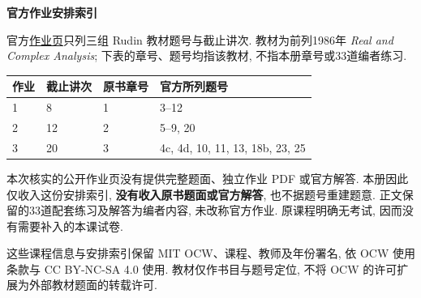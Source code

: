 \clearpage
{}
{}
\begin{center}
{\color{structurecolor}\bfseries\fontsize{14.4}{20}\selectfont 官方作业安排索引\par}
\end{center}
官方\href{https://ocw.mit.edu/courses/18-125-measure-and-integration-fall-2003/pages/assignments/}{作业页}只列三组 Rudin 教材题号与截止讲次. 教材为前列1986年 \textit{Real and Complex Analysis}; 下表的章号、题号均指该教材, 不指本册章号或33道编者练习.

\begin{center}
\begin{tabular}{@{}p{}p{}p{}p{}@{}}
\toprule
作业 & 截止讲次 & 原书章号 & 官方所列题号 \\
\midrule
1 & 8 & 1 & 3--12 \\
2 & 12 & 2 & 5--9, 20 \\
3 & 20 & 3 & 4c, 4d, 10, 11, 13, 18b, 23, 25 \\
\bottomrule
\end{tabular}
\end{center}

本次核实的公开作业页没有提供完整题面、独立作业 PDF 或官方解答. 本册因此仅收入这份安排索引, \textbf{没有收入原书题面或官方解答}, 也不据题号重建题意. 正文保留的33道配套练习及解答为编者内容, 未改称官方作业. 原课程明确无考试, 因而没有需要补入的本课试卷.

这些课程信息与安排索引保留 MIT OCW、课程、教师及年份署名, 依 OCW 使用条款与 CC BY-NC-SA 4.0 使用. 教材仅作书目与题号定位, 不将 OCW 的许可扩展为外部教材题面的转载许可.
